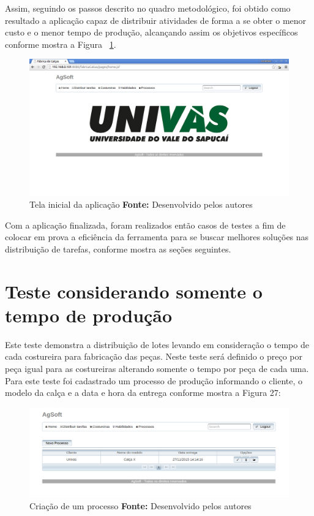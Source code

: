 \par Assim, seguindo os passos descrito no quadro metodológico, foi obtido como resultado a aplicação
capaz de distribuir atividades de forma a se obter o menor custo e o menor tempo de produção, 
alcançando assim os objetivos específicos conforme mostra a Figura ~\ref{fig:tela_inicial_da_aplicação}.

\begin{figure}[h!]
	\centerline{\includegraphics[scale=0.3]{./imagens/tela_inicial.png}}
	\caption[Tela inicial da aplicação]
	{Tela inicial da aplicação \textbf{Fonte:} Desenvolvido pelos autores}
	\label{fig:tela_inicial_da_aplicação}
\end{figure}


\par Com a aplicação finalizada, foram realizados então casos de testes a fim de colocar em prova a eficiência da ferramenta para se 
buscar melhores soluções nas distribuição de tarefas, conforme mostra as seções
seguintes.


\section{Teste considerando somente o tempo de produção}

\par Este teste demonstra a distribuição de lotes levando em consideração o
tempo de cada costureira para fabricação das peças. Neste teste será definido o
preço por peça igual para as costureiras alterando somente o tempo por peça de
cada uma. Para este teste foi cadastrado um processo de produção informando o
cliente, o modelo da calça e a data e hora da entrega conforme mostra a Figura 27:
\newpage

\begin{figure}[h!]
	\centerline{\includegraphics[scale=0.4]{./imagens/teste_processo.png}}
	\caption[Criação de um processo]
	{Criação de um processo \textbf{Fonte:} Desenvolvido pelos autores}
	\label{fig:exemplo1}
\end{figure}

